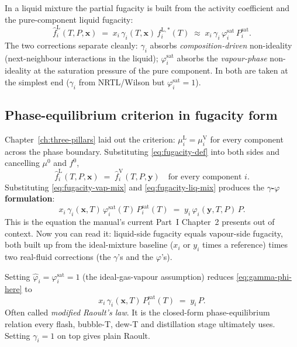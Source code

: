 \documentclass[11pt,a4paper]{article}
\begin{document}
In a liquid mixture the partial fugacity is built from the
activity coefficient and the pure-component liquid fugacity:
\begin{equation}
   \hat f_i^{\mathrm{L}}(T, P, \mathbf{x})
   \;=\; x_i\,\gamma_i(T, \mathbf{x})\,f^{\mathrm{L},*}_i(T)
   \;\approx\; x_i\,\gamma_i\,\varphi_i^{\mathrm{sat}}\,P_i^{\mathrm{sat}}.
   \label{eq:fugacity-liq-mix}
\end{equation}
The two corrections separate cleanly: $\gamma_i$ absorbs
\emph{composition-driven} non-ideality (next-neighbour interactions
in the liquid); $\varphi_i^{\mathrm{sat}}$ absorbs the
\emph{vapour-phase} non-ideality at the saturation pressure of the
pure component.  In both are taken at the simplest end
($\gamma_i$ from NRTL/Wilson but $\varphi_i^{\mathrm{sat}} = 1$).

\subsection{Phase-equilibrium criterion in fugacity form}

Chapter~\ref{ch:three-pillars} laid out the criterion:
$\mu_i^{\mathrm{L}} = \mu_i^{\mathrm{V}}$ for every component
across the phase boundary.  Substituting \eqref{eq:fugacity-def}
into both sides and cancelling $\mu^0$ and $f^0$,
\begin{equation}
   \boxed{\;
   \hat f_i^{\mathrm{L}}(T, P, \mathbf{x})
   \;=\;
   \hat f_i^{\mathrm{V}}(T, P, \mathbf{y})
   \quad\text{for every component } i.
   \;}
   \label{eq:fugacity-equilibrium}
\end{equation}
Substituting \eqref{eq:fugacity-vap-mix} and
\eqref{eq:fugacity-liq-mix} produces the
\textbf{$\gamma$-$\varphi$ formulation}:
\begin{equation}
   x_i\,\gamma_i(\mathbf{x},T)\,\varphi_i^{\mathrm{sat}}(T)\,P_i^{\mathrm{sat}}(T)
   \;=\;
   y_i\,\hat\varphi_i(\mathbf{y},T,P)\,P.
   \label{eq:gamma-phi-here}
\end{equation}
This is the equation the manual's current Part~I Chapter~2 presents
out of context.  Now you can read it: liquid-side fugacity equals
vapour-side fugacity, both built up from the ideal-mixture baseline
($x_i$ or $y_i$ times a reference) times two real-fluid corrections
(the $\gamma$'s and the $\varphi$'s).

Setting $\hat\varphi_i = \varphi_i^{\mathrm{sat}} = 1$ (the ideal-gas-vapour assumption) reduces \eqref{eq:gamma-phi-here} to
\begin{equation}
   \boxed{\;
   x_i\,\gamma_i(\mathbf{x}, T)\,P_i^{\mathrm{sat}}(T)
   \;=\; y_i\,P.
   \;}
   \label{eq:modified-raoult}
\end{equation}
Often called \emph{modified Raoult's law}.  It is the closed-form
phase-equilibrium relation every flash, bubble-T, dew-T and
distillation stage  ultimately uses.  Setting $\gamma_i = 1$
on top gives plain Raoult.
\end{document}
